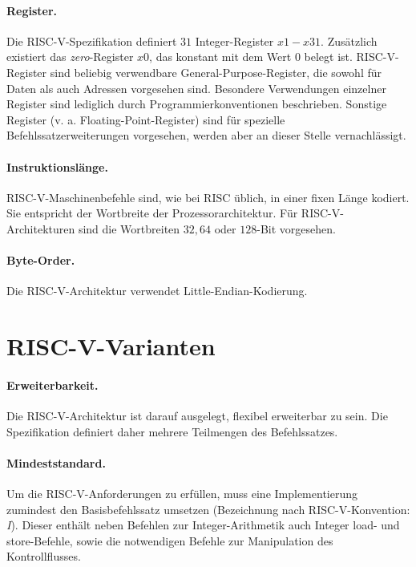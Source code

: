 \paragraph{Register.} Die RISC-V-Spezifikation definiert $31$
Integer-Register $x1 - x31$. Zusätzlich existiert das
\textit{zero}-Register $x0$, das konstant mit dem Wert $0$ belegt ist. RISC-V-Register sind beliebig verwendbare General-Purpose-Register, die sowohl für Daten als auch Adressen vorgesehen sind. Besondere Verwendungen einzelner Register sind lediglich durch Programmierkonventionen beschrieben. Sonstige Register (v. a. Floating-Point-Register) sind für spezielle Befehlssatzerweiterungen vorgesehen, werden aber an dieser Stelle vernachlässigt.

\paragraph{Instruktionslänge.} RISC-V-Maschinenbefehle sind, wie bei
RISC üblich, in einer fixen Länge kodiert. Sie entspricht der Wortbreite
der Prozessorarchitektur. Für RISC-V-Architekturen sind die Wortbreiten
$32, 64$ oder $128$-Bit vorgesehen.

\paragraph{Byte-Order.} Die RISC-V-Architektur verwendet Little-Endian-Kodierung.

\section{RISC-V-Varianten}
\label{sec:erweiterung}

\paragraph{Erweiterbarkeit.} Die RISC-V-Architektur ist darauf ausgelegt, flexibel erweiterbar zu sein. Die Spezifikation definiert daher mehrere Teilmengen des Befehlssatzes. \cite[p. 4]{RISC}

\paragraph{Mindeststandard.} Um die RISC-V-Anforderungen zu erfüllen,
muss eine Implementierung zumindest den Basisbefehlssatz umsetzen
(Bezeichnung nach \mbox{RISC-V}-Konvention: \textit{I}). Dieser enthält
neben Befehlen zur Integer-Arithmetik auch Integer load- und store-Befehle, sowie die notwendigen Befehle zur Manipulation des Kontrollflusses.

